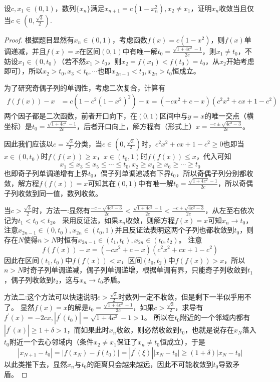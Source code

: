 \documentclass[../../main.tex]{subfiles}%
\begin{document}
\begin{example}
设\(c,x_1\in(0,1)\)，数列\(\{x_n\}\)满足\(x_{n + 1}=c(1 - x_n^2),x_2\neq x_1\)，证明\(x_n\)收敛当且仅当\(c\in\left(0,\frac{\sqrt{3}}{2}\right)\).
\end{example}
\begin{proof}

根据题目显然有\(x_n\in(0,1)\)，考虑函数\(f(x)=c(1 - x^2)\)，则\(f(x)\)单调递减，并且\(f(x)=x\)在区间\((0,1)\)中有唯一解\(t_0 = \frac{\sqrt{1 + 4c^2}-1}{2c}\)，则\(x_1\neq t_0\)，不妨设\(x_1\in(0,t_0)\)（若不然\(x_1 > t_0\)，则\(x_2 = f(x_1)<f(t_0)=t_0\)，从\(x_2\)开始考虑即可），所以\(x_2>t_0,x_3<t_0,\cdots\)也即\(x_{2n - 1}<t_0,x_{2n}>t_0\)恒成立。

为了研究奇偶子列的单调性，考虑二次复合，计算有
\begin{align*}
f(f(x)) - x&=c\left(1 - c^2(1 - x^2)^2\right)-x=(-cx^2 + c - x)(c^2x^2 + cx + 1 - c^2)
\end{align*}
两个因子都是二次函数，前者开口向下，在\((0,1)\)区间中与\(y = x\)的唯一交点（横坐标）是\(t_0 = \frac{\sqrt{1 + 4c^2}-1}{2c}\)，后者开口向上，解方程有（形式上）\(x=\frac{-c\pm\sqrt{4c^2 - 3}}{2c}\)。

因此我们应该以\(c = \frac{\sqrt{3}}{2}\)分类，当\(c\in\left(0,\frac{\sqrt{3}}{2}\right)\)时，\(c^2x^2 + cx + 1 - c^2\geqslant 0\)也即当\(x\in(0,t_0)\)时\(f(f(x))\geqslant  x\)，\(x\in(t_0,1)\)时\(f(f(x))\leqslant  x\)，代入可知
\[x_1\leqslant  x_3\leqslant  x_5\leqslant \cdots\leqslant  t_0,x_2\geqslant  x_4\geqslant  x_6\geqslant \cdots\geqslant  t_0\]
也即奇子列单调递增有上界\(t_0\)，偶子列单调递减有下界\(t_0\)，所以奇偶子列分别都收敛，解方程\(f(f(x)) = x\)可知其在\((0,1)\)中有唯一解\(t_0 = \frac{\sqrt{1 + 4c^2}-1}{2c}\)，所以奇偶子列收敛到同一值，数列收敛。

当\(c>\frac{\sqrt{3}}{2}\)时，{\color{blue}方法一:}显然有\(\frac{-c - \sqrt{4c^2 - 3}}{2c}<\frac{\sqrt{1 + 4c^2}-1}{2c}<\frac{-c + \sqrt{4c^2 - 3}}{2c}\)，从左至右依次记为\(t_1<t_0<t_2\)。
采用反证法，如果\(x_n\)收敛，则解方程\(f(x)=x\)可知\(x_n\rightarrow t_0\)，注意\(x_{2n - 1}\in(0,t_0),x_{2n}\in(t_0,1)\)并且反证法表明这两个子列也都收敛到\(t_0\)，则存在\(N\)使得\(n > N\)时恒有\(x_{2n - 1}\in(t_1,t_0),x_{2n}\in(t_0,t_2)\)。
注意
\[f(f(x)) - x=(-cx^2 + c - x)(c^2x^2 + cx + 1 - c^2)\]
因此在区间\((t_1,t_0)\)中\(f(f(x))<x\)，区间\((t_0,t_2)\)中\(f(f(x))>x\)，所以\(n > N\)时奇子列单调递减，偶子列单调递增，根据单调有界，只能奇子列收敛到\(t_1\)，偶子列收敛到\(t_2\)，这与\(x_n\rightarrow t_0\)矛盾。

{\color{blue}方法二:}这个方法可以快速说明\(c>\frac{\sqrt{3}}{2}\)时数列一定不收敛，但是剩下一半似乎用不了。
显然\(f(x)=x\)的解是\(t_0 = \frac{\sqrt{1 + 4c^2}-1}{2c}\)，如果\(c>\frac{\sqrt{3}}{2}\)，求导有\(f^\prime(x)=-2cx,|f^\prime(t_0)|=\sqrt{1 + 4c^2}-1>1\)。
所以在\(t_0\)附近的一个邻域内都有\(|f^\prime(x)|\geqslant 1+\delta>1\)，而如果此时\(x_n\)收敛，则必然收敛到\(t_0\)，也就是说存在\(x_N\)落入\(t_0\)附近一个去心邻域内（条件\(x_2\neq x_1\)保证了\(x_n\neq t_0\)恒成立），于是
\[|x_{N + 1}-t_0|=|f(x_N)-f(t_0)|=|f^\prime(\xi)||x_N - t_0|\geqslant (1 + \delta)|x_N - t_0|\]
以此类推下去，显然\(x_n\)与\(t_0\)的距离只会越来越远，因此不可能收敛到\(t_0\)导致矛盾。

\end{proof}
\end{document}
